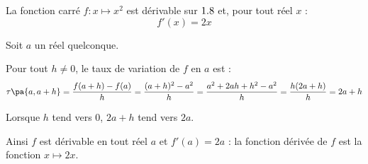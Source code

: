 \begin{propriete}
	La fonction carré $f : x \longmapsto x^2$ est dérivable sur $1.8$ et, pour tout réel $x$ :
	\[
		f'(x) = 2x
	\]

\end{propriete}

\begin{demonstration}
	Soit $a$ un réel quelconque.

	Pour tout $h \neq 0$, le taux de variation de $f$ en $a$ est :
	\[
		\tau\pa{a,a+h} = \dfrac{f(a + h) - f(a)}{h} = \dfrac{(a + h)^2 - a^2}{h} = \dfrac{a^2 + 2ah + h^2 - a^2}{h} = \dfrac{h(2a + h)}{h} = 2a + h
	\]

	Lorsque $h$ tend vers $0$, $2a + h$ tend vers $2a$.

	Ainsi $f$ est dérivable en tout réel $a$ et $f'(a) = 2a$ : la fonction dérivée de $f$ est la fonction $x \longmapsto 2x$.
\end{demonstration}

